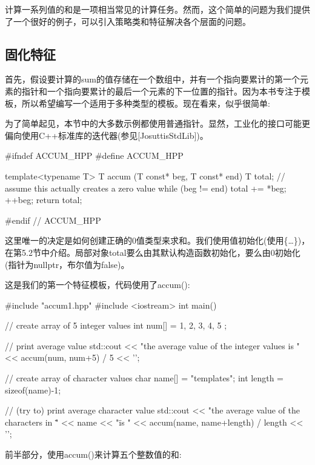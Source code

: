 
计算一系列值的和是一项相当常见的计算任务。然而，这个简单的问题为我们提供了一个很好的例子，可以引入策略类和特征解决各个层面的问题。

\subsection{固化特征}

首先，假设要计算的sum的值存储在一个数组中，并有一个指向要累计的第一个元素的指针和一个指向要累计的最后一个元素的下一位置的指针。因为本书专注于模板，所以希望编写一个适用于多种类型的模板。现在看来，似乎很简单:

\begin{notice}为了简单起见，本节中的大多数示例都使用普通指针。显然，工业化的接口可能更偏向使用C++标准库的迭代器(参见[JosuttisStdLib])。
\end{notice}

\begin{cpp}
#ifndef ACCUM_HPP
#define ACCUM_HPP

template<typename T>
T accum (T const* beg, T const* end)
{
	T total{}; // assume this actually creates a zero value
	while (beg != end) {
		total += *beg;
		++beg;
	}
	return total;
}

#endif // ACCUM_HPP
\end{cpp}

这里唯一的决定是如何创建正确的0值类型来求和。我们使用值初始化(使用\{…\})，在第5.2节中介绍。局部对象total要么由其默认构造函数初始化，要么由0初始化(指针为nullptr，布尔值为false)。

这是我们的第一个特征模板，代码使用了accum():

\begin{cpp}
#include "accum1.hpp"
#include <iostream>
int main()
{
	// create array of 5 integer values
	int num[] = { 1, 2, 3, 4, 5 };
	
	// print average value
	std::cout << "the average value of the integer values is "
			  << accum(num, num+5) / 5
			  << ’\n’;
			  
	// create array of character values
	char name[] = "templates";
	int length = sizeof(name)-1;
	
	// (try to) print average character value
	std::cout << "the average value of the characters in \""
			  << name << "\" is "
			  << accum(name, name+length) / length
			  << ’\n’;
}
\end{cpp}

前半部分，使用accum()来计算五个整数值的和:

